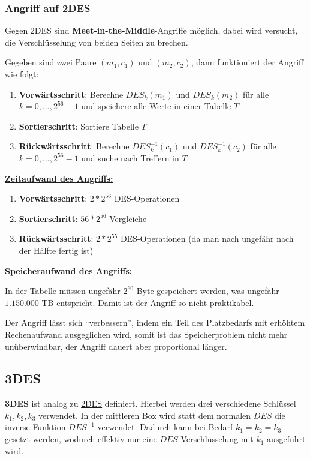 \documentclass[12pt,A4]{extarticle}
\begin{document}
\subsubsection{Angriff auf 2DES}
Gegen 2DES sind \textbf{Meet-in-the-Middle}-Angriffe möglich, dabei wird versucht, die Verschlüsselung von beiden Seiten zu brechen.\par
Gegeben sind zwei Paare $(m_1, c_1)$ und $(m_2, c_2)$, dann funktioniert der Angriff wie folgt:
\begin{enumerate}
  \item{\textbf{Vorwärtsschritt}: Berechne $DES_{k}(m_1)$ und $DES_{k}(m_2)$ für alle $k = 0, \dots, 2^{56} - 1$ und speichere alle Werte in einer Tabelle $T$}
  \item{\textbf{Sortierschritt}: Sortiere Tabelle $T$}
  \item{\textbf{Rückwärtsschritt}: Berechne $DES^{-1}_{k}(c_1)$ und $DES^{-1}_{k}(c_2)$ für alle $k = 0, \dots, 2^{56} - 1$ und suche nach Treffern in $T$}
\end{enumerate}
\underline{\textbf{Zeitaufwand des Angriffs:}}
\begin{enumerate}
  \item{\textbf{Vorwärtsschritt}: $2 * 2^{56}$ DES-Operationen}
  \item{\textbf{Sortierschritt}: $56 * 2^{56}$ Vergleiche}
  \item{\textbf{Rückwärtsschritt}: $2 * 2^{55}$ DES-Operationen (da man nach ungefähr nach der Hälfte fertig ist)}
\end{enumerate}
\underline{\textbf{Speicheraufwand des Angriffs:}}\par
In der Tabelle müssen ungefähr $2^{60}$ Byte gespeichert werden, was ungefähr $1.150.000$ TB entspricht. Damit ist der Angriff so nicht praktikabel.\par
Der Angriff lässt sich ``verbessern'', indem ein Teil des Platzbedarfs mit erhöhtem Rechenaufwand ausgeglichen wird, somit ist das Speicherproblem nicht mehr unüberwindbar, der Angriff dauert aber proportional länger.

\subsection{3DES}
\textbf{3DES} ist analog zu \hyperref[sec:2des]{2DES} definiert. Hierbei werden drei verschiedene Schlüssel $k_1, k_2, k_3$ verwendet. In der mittleren Box wird statt dem normalen $DES$ die inverse Funktion $DES^{-1}$ verwendet. Dadurch kann bei Bedarf $k_1 = k_2 = k_3$ gesetzt werden, wodurch effektiv nur eine $DES$-Verschlüsselung mit $k_1$ ausgeführt wird.\par
\end{document}
